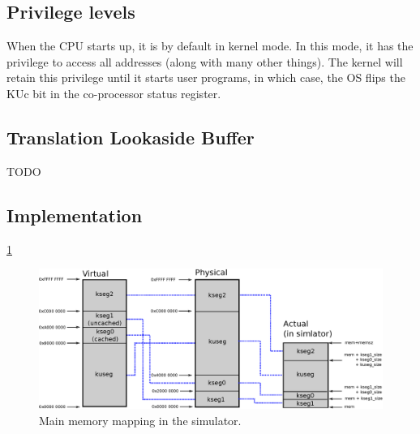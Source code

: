 \subsection{Privilege levels}
When the CPU starts up, it is by default in kernel mode. In this mode, it has
the privilege to access all addresses (along with many other things). The
kernel will retain this privilege until it starts user programs, in which case,
the OS flips the KUc bit in the co-processor status register\cite{harvard_mips_summary}.

\subsection{Translation Lookaside Buffer}
TODO

\subsection{Implementation}
\ref{fig:address_space_mapping}

\begin{figure}[ht]
	\centering
	\includegraphics[scale=0.70]{mmu/memory_mapping.eps}
	\caption{Main memory mapping in the simulator.}
	\label{fig:address_space_mapping}
\end{figure}
